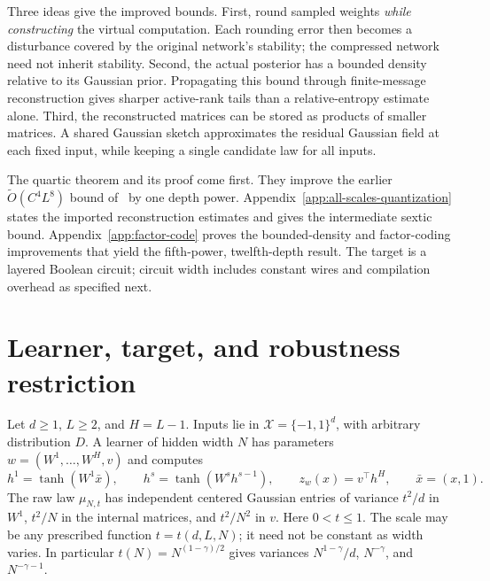 \documentclass[11pt]{article}
\begin{document}
Three ideas give the improved bounds. First, round sampled weights
\emph{while constructing} the virtual computation. Each rounding error
then becomes a disturbance covered by the original network's stability;
the compressed network need not inherit stability. Second, the actual
posterior has a bounded density relative to its Gaussian prior. Propagating
this bound through finite-message reconstruction gives sharper active-rank
tails than a relative-entropy estimate alone. Third, the reconstructed
matrices can be stored as products of smaller matrices. A shared Gaussian
sketch approximates the residual Gaussian field at each fixed input,
while keeping a single candidate law for all inputs.

The quartic theorem and its proof come first. They improve the earlier
$\widetilde O(C^4L^8)$ bound of~\cite{quartic} by one depth power.
Appendix~\ref{app:all-scales-quantization} states the imported reconstruction
estimates and gives the intermediate sextic bound.
Appendix~\ref{app:factor-code} proves the bounded-density and factor-coding
improvements that yield the fifth-power, twelfth-depth result. The target
is a layered Boolean circuit; circuit width includes constant wires and
compilation overhead as specified next.

\section{Learner, target, and robustness restriction}

Let $d\ge1$, $L\ge2$, and $H=L-1$. Inputs lie in
$\mathcal X=\{-1,1\}^d$, with arbitrary distribution $D$.
A learner of hidden width $N$ has parameters $w=(W^1,\ldots,W^H,v)$ and
computes
\[
 h^1=\tanh(W^1\bar x),\qquad
 h^s=\tanh(W^sh^{s-1}),\qquad
 z_w(x)=v^\top h^H,\qquad \bar x=(x,1).
\]
The raw law $\mu_{N,t}$ has independent centered Gaussian entries of
variance $t^2/d$ in $W^1$, $t^2/N$ in the internal matrices, and
$t^2/N^2$ in $v$. Here $0<t\le1$. The scale may be any prescribed
function $t=t(d,L,N)$; it need not be constant as width varies.
In particular $t(N)=N^{(1-\gamma)/2}$ gives variances
$N^{1-\gamma}/d$, $N^{-\gamma}$, and $N^{-\gamma-1}$.
\end{document}
